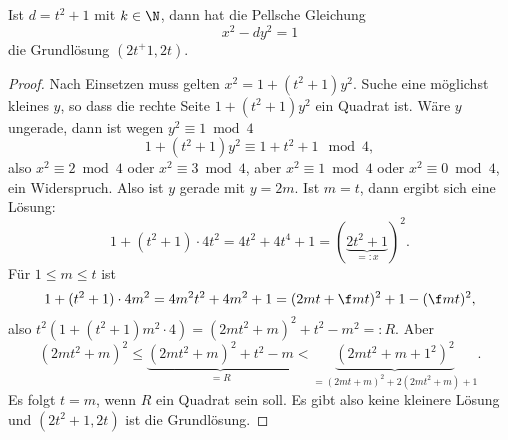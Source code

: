 \begin{st} \label{4.23}
	Ist $d = t^2 + 1$ mit $k \in \N$, dann hat die Pellsche Gleichung
	\[
		x^2 - dy^2 = 1
	\]
	die Grundlösung $(2t^ + 1, 2t)$.
	\begin{proof}
		Nach Einsetzen muss gelten $x^2 = 1 + (t^2 + 1)y^2$.
		Suche eine möglichst kleines $y$, so dass die rechte Seite $1 + (t^2 + 1)y^2$ ein Quadrat ist.
		Wäre $y$ ungerade, dann ist wegen $y^2 \equiv 1 \bmod 4$
		\[
			1 + (t^2 + 1)y^2
			\equiv 1 + t^2 + 1 \mod 4,
		\]
		also $x^2 \equiv 2 \bmod 4$ oder $x^2 \equiv 3 \bmod 4$, aber $x^2 \equiv 1 \bmod 4$ oder $x^2 \equiv 0 \bmod 4$, ein Widerspruch.
		Also ist $y$ gerade mit $y = 2m$.
		Ist $m = t$, dann ergibt sich eine Lösung:
		\[
			1 + (t^2 + 1)\cdot 4t^2
			= 4t^2 + 4t^4 + 1
			= (\underbrace{2t^2 + 1}_{=:x})^2.
		\]
		Für $1 \le m \le t$ ist
		\[
			1 + (t^2 + 1)\cdot 4m^2
			= 4m^2 t^2 + 4m^2 + 1
			= (2mt + \f mt)^2 + 1 - (\f mt)^2,
		\]
		also $t^2(1 + (t^2 + 1)m^2\cdot 4) = (2mt^2 + m)^2 + t^2 - m^2 =: R$.
		Aber
		\[
			(2mt^2 + m)^2
			\le \underbrace{(2mt^2 + m)^2 + t^2 - m}_{=R}
			< \underbrace{(2mt^2 + m + 1^2)^2}_{= (2mt + m)^2 + 2(2mt^2 + m) + 1}.
		\]
		Es folgt $t = m$, wenn $R$ ein Quadrat sein soll.
		Es gibt also keine kleinere Lösung und $(2t^2 + 1, 2t)$ ist die Grundlösung.
	\end{proof}
\end{st}
